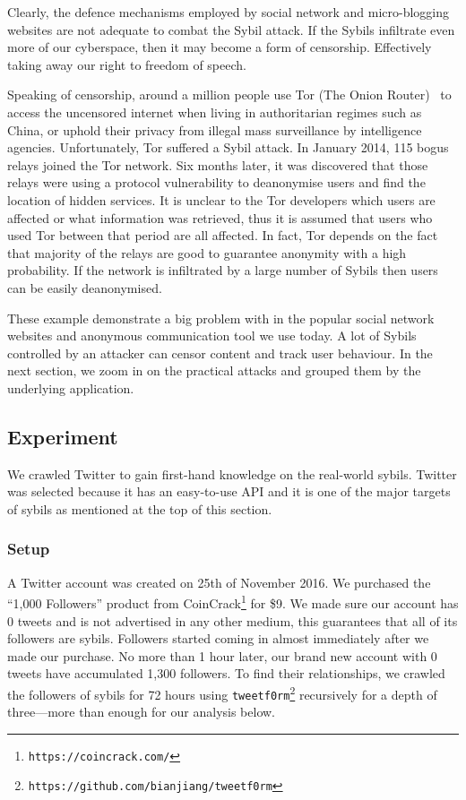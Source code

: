 Clearly, the defence mechanisms employed by social network and micro-blogging
websites are not adequate to combat the Sybil attack. If the Sybils infiltrate
even more of our cyberspace, then it may become a form of censorship.
Effectively taking away our right to freedom of speech.

Speaking of censorship, around a million \cite{tormetric} people use Tor (The
Onion Router)~\cite{dingledine2004tor} to access the uncensored internet when
living in authoritarian regimes such as China, or uphold their privacy from
illegal mass surveillance by intelligence agencies. Unfortunately, Tor suffered
a Sybil attack. In January 2014, 115 bogus relays joined the Tor network. Six months
later, it was discovered that those relays were using a protocol vulnerability
to deanonymise users and find the location of hidden services. It is unclear to
the Tor developers which users are affected or what information was retrieved,
thus it is assumed that users who used Tor between that period are all
affected\cite{torsybil}. In fact, Tor depends on the fact that majority of the
relays are good to guarantee anonymity with a high probability. If the network
is infiltrated by a large number of Sybils then users can be easily
deanonymised.

These example demonstrate a big problem with in the popular social network
websites and anonymous communication tool we use today. A lot of Sybils
controlled by an attacker can censor content and track user behaviour. In the
next section, we zoom in on the practical attacks and grouped them by the
underlying application.

\subsection{Experiment}
We crawled Twitter to gain first-hand knowledge on the real-world sybils.
Twitter was selected because it has an easy-to-use API and it is one of the
major targets of sybils as mentioned at the top of this section.

\subsubsection{Setup}
A Twitter account was created on 25th of November 2016. We purchased the ``1,000
Followers'' product from CoinCrack\footnote{\texttt{https://coincrack.com/}} for
\$9. We made sure our account has 0 tweets and is not advertised in any other
medium, this guarantees that all of its followers are sybils. Followers started
coming in almost immediately after we made our purchase. No more than 1 hour
later, our brand new account with 0 tweets have accumulated 1,300 followers. To
find their relationships, we crawled the followers of sybils for 72 hours using
\verb!tweetf0rm!\footnote{\texttt{https://github.com/bianjiang/tweetf0rm}}
recursively for a depth of three---more than enough for our analysis below.


